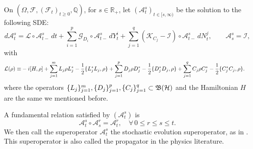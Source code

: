 \documentclass[aihp,12pt]{imsart}
\begin{document}
On $(\Omega,\mathcal F,(\mathcal F_t)_{t\geq0},\mathbb Q)$, for $s\in\mathbb R_+$, let $(\mathcal A_t^s)_{t\in[s,\infty)}$ be the solution to the following SDE:
\begin{equation}\label{eq_defS}
d \mathcal A_{t}^s= \mathcal L\circ\mathcal A_{t-}^{s}\,d t+\sum_{i=1}^p \mathcal G_{D_i}\circ \mathcal A_{t-}^{s}\,d Y^i_t+\sum_{j=1}^q(\mathcal K_{C_j}-\mathcal I)\circ \mathcal A_{t-}^{s}\,d N^j_t,\qquad \mathcal A_s^s=\mathcal I,
\end{equation}
with
\begin{equation}
    \begin{split}
        \mathcal{L}(\rho) \equiv&  -i[H,\rho] + \sum_{j=1}^m L_j\rho L_j^*-\frac{1}{2}\{L_j^* L_j,\rho\} + \sum_{j=1}^p D_j\rho D_j^*-\frac{1}{2}\{D_j^* D_j,\rho\} + \sum_{j=1}^q C_j\rho C_j^*-\frac{1}{2}\{C_j^* C_j,\rho\}.
    \end{split}
\end{equation}
where the operators $\{L_j\}_{j=1}^m,\{D_j\}_{j=1}^p,\{C_j\}_{j=1}^q \subset\mathfrak{B}(\mathcal{H})$ and the Hamiltonian $H$ are the same we mentioned before.

A fundamental relation satisfied by $(\mathcal A_{t}^s)$ is 
$$\mathcal A_t^s\circ\mathcal A_s^r=\mathcal A_t^r,\quad \forall\, 0\leq r\leq s\leq t.$$
We then call the superoperator $\mathcal A_t^s$ the stochastic evolution superoperator, as in \cite{barchielli2009quantum}.  This superoperator is also called the propagator in the physics literature. 
\end{document}

